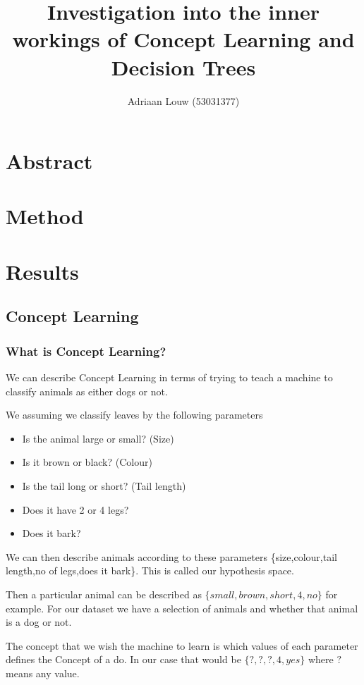 \documentclass[10pt,a4paper]{article}
\title{Investigation into the inner workings of Concept Learning and Decision Trees}
\author{ Adriaan Louw (53031377)}
\begin{document}
\maketitle

\tableofcontents

\section{Abstract}

\section{Method}

\section{Results}
\subsection{Concept Learning}
\subsubsection{What is Concept Learning?}
We can describe Concept Learning in terms of trying to teach a machine to classify animals as either dogs or not.

We assuming we classify leaves by the following parameters
\begin{itemize}
\item Is the animal large or small? (Size)
\item Is it brown or black? (Colour)
\item Is the tail long or short? (Tail length)
\item Does it have 2 or 4 legs?
\item Does it bark?
\end{itemize}

We can then describe animals according to these parameters
\{size,colour,tail length,no of legs,does it bark\}. This is called our hypothesis space.

Then a particular animal can be described as $\{ small, brown, short, 4, no\}$ for example. For our dataset we have a selection of animals and whether that animal is a dog or not.

The concept that we wish the machine to learn is which values of each parameter defines the Concept of a do. In our case that would be $\{?, ?, ?, 4, yes\}$ where $?$ means any value.
\end{document}
